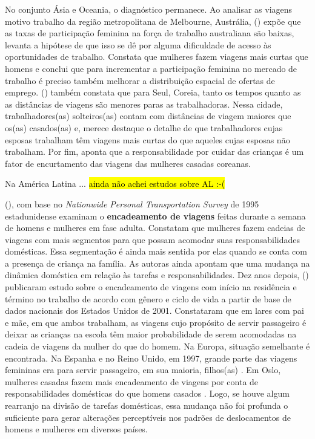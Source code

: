 No conjunto Ásia e Oceania, o diagnóstico permanece.
Ao analisar as viagens motivo trabalho da região metropolitana de Melbourne, Austrália,  (\citeyear{HOWE1982}) expõe que as taxas de participação feminina na força de trabalho australiana são baixas, levanta a hipótese de que isso se dê por alguma dificuldade de acesso às oportunidades de trabalho. Constata que mulheres fazem viagens mais curtas que homens e conclui que para incrementar a participação feminina no mercado de trabalho é preciso também melhorar a distribuição espacial de ofertas de emprego.
 (\citeyear{SONG2003}) também constata que para Seul, Coreia, tanto os tempos quanto as as distâncias de viagens são menores paras as trabalhadoras. Nessa cidade, trabalhadores(as) solteiros(as) contam com distâncias de viagem maiores que os(as) casados(as) e, merece destaque o detalhe de que trabalhadores cujas esposas trabalham têm viagens mais curtas do que aqueles cujas esposas não trabalham. Por fim,  aponta que a responsabilidade por cuidar das crianças é um fator de encurtamento das viagens das mulheres casadas coreanas.

Na América Latina ... \hl{ainda não achei estudos sobre AL :-( }





 (\citeyear{MCGUCKIN1995}), com base no  \emph{Nationwide Personal Transportation Survey} de 1995 estadunidense examinam o \textbf{encadeamento de viagens} feitas durante a semana de homens e mulheres em fase adulta. Constatam que mulheres fazem cadeias de viagens com mais segmentos para que possam acomodar suas responsabilidades domésticas. Essa segmentação é ainda mais sentida por elas quando se conta com a presença de criança na família. As autoras ainda apontam que uma mudança na dinâmica doméstica em relação às tarefas e responsabilidades.
Dez anos depois,  (\citeyear{MCNUCKIN2005}) publicaram estudo sobre o encadeamento de viagens com início na residência e término no trabalho de acordo com gênero e ciclo de vida a partir de base de dados nacionais dos Estados Unidos de 2001. Constataram que em lares com pai e mãe, em que ambos trabalham, as viagens cujo propósito de servir passageiro é deixar as crianças na escola têm maior probabilidade de serem acomodadas na cadeia de viagens da mulher do que do homem.
Na Europa, situação semelhante é encontrada. Na Espanha e no Reino Unido, em 1997, grande parte das viagens femininas era para servir passageiro, em sua maioria, filhos(as) \cite{ROOT1999}. 
Em Oslo, mulheres casadas fazem mais encadeamento de viagens por conta de responsabilidades domésticas do que homens casados \cite{HJORTHOL2000}.
Logo, se houve algum rearranjo na divisão de tarefas domésticas, essa mudança não foi profunda o suficiente para gerar alterações perceptíveis nos padrões de deslocamentos de homens e mulheres em diversos países.


